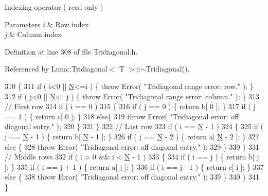 Indexing operator ( read only ) 


\begin{DoxyParams}{Parameters}
{\em i} & Row index \\
\hline
{\em j} & Column index \\
\hline
\end{DoxyParams}


Definition at line 308 of file Tridiagonal.\+h.



Referenced by Luna\+::\+Tridiagonal$<$ T $>$\+::$\sim$\+Tridiagonal().


\begin{DoxyCode}
310   \{
311     \textcolor{keywordflow}{if} ( i<0 || \hyperlink{namespaceHeat__plot_a7d050092798e28458a263710837bda77}{N}<=i ) \{ \textcolor{keywordflow}{throw} Error( \textcolor{stringliteral}{"Tridiagonal range error: row."} ); \}
312     \textcolor{keywordflow}{if} ( j<0 || \hyperlink{namespaceHeat__plot_a7d050092798e28458a263710837bda77}{N}<=j ) \{ \textcolor{keywordflow}{throw} Error( \textcolor{stringliteral}{"Tridiagonal range error: column."} ); \}
313     \textcolor{comment}{// First row}
314     \textcolor{keywordflow}{if} ( i == 0 )
315     \{
316       \textcolor{keywordflow}{if} ( j == 0 ) \{ \textcolor{keywordflow}{return} b[ 0 ]; \}
317       \textcolor{keywordflow}{if} ( j == 1 ) \{ \textcolor{keywordflow}{return} c[ 0 ]; \}
318       \textcolor{keywordflow}{else}\{
319         \textcolor{keywordflow}{throw} Error( \textcolor{stringliteral}{"Tridiagonal error: off diagonal entry."} );
320       \}
321     \}
322     \textcolor{comment}{// Last row}
323     \textcolor{keywordflow}{if} ( i == \hyperlink{namespaceHeat__plot_a7d050092798e28458a263710837bda77}{N} - 1 )
324     \{
325       \textcolor{keywordflow}{if} ( j == \hyperlink{namespaceHeat__plot_a7d050092798e28458a263710837bda77}{N} - 1 ) \{ \textcolor{keywordflow}{return} b[ \hyperlink{namespaceHeat__plot_a7d050092798e28458a263710837bda77}{N} - 1 ]; \}
326       \textcolor{keywordflow}{if} ( j == \hyperlink{namespaceHeat__plot_a7d050092798e28458a263710837bda77}{N} - 2 ) \{ \textcolor{keywordflow}{return} a[ \hyperlink{namespaceHeat__plot_a7d050092798e28458a263710837bda77}{N} - 2 ]; \}
327       \textcolor{keywordflow}{else} \{
328         \textcolor{keywordflow}{throw} Error( \textcolor{stringliteral}{"Tridiagonal error: off diagonal entry."} );
329       \}
330     \}
331     \textcolor{comment}{// Middle rows}
332     \textcolor{keywordflow}{if} ( i > 0 && i < \hyperlink{namespaceHeat__plot_a7d050092798e28458a263710837bda77}{N} - 1 )
333     \{
334       \textcolor{keywordflow}{if} ( i == j ) \{ \textcolor{keywordflow}{return} b[ j ]; \}
335       \textcolor{keywordflow}{if} ( i == j + 1 ) \{ \textcolor{keywordflow}{return} a[ j ]; \}
336       \textcolor{keywordflow}{if} ( i == j - 1 ) \{ \textcolor{keywordflow}{return} c[ i ]; \}
337       \textcolor{keywordflow}{else} \{
338         \textcolor{keywordflow}{throw} Error( \textcolor{stringliteral}{"Tridiagonal error: off diagonal entry."} );
339       \}
340     \}
341   \}
\end{DoxyCode}
